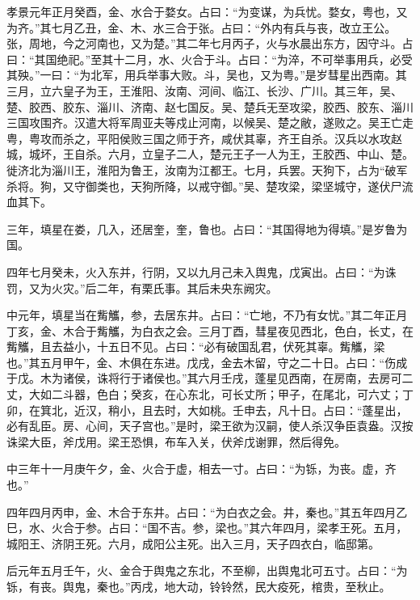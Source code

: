 \documentclass[12pt,UTF8]{ctexbook}
\begin{document}
孝景元年正月癸酉，金、水合于婺女。占曰：“为变谋，为兵忧。婺女，粤也，又为齐。”其七月乙丑，金、木、水三合于张。占曰：“外内有兵与丧，改立王公。张，周地，今之河南也，又为楚。”其二年七月丙子，火与水晨出东方，因守斗。占曰：“其国绝祀。”至其十二月，水、火合于斗。占曰：“为淬，不可举事用兵，必受其殃。”一曰：“为北军，用兵举事大败。斗，吴也，又为粤。”是岁彗星出西南。其三月，立六皇子为王，王淮阳、汝南、河间、临江、长沙、广川。其三年，吴、楚、胶西、胶东、淄川、济南、赵七国反。吴、楚兵无至攻梁，胶西、胶东、淄川三国攻围齐。汉遣大将军周亚夫等戍止河南，以候吴、楚之敝，遂败之。吴王亡走粤，粤攻而杀之，平阳侯败三国之师于齐，咸伏其辜，齐王自杀。汉兵以水攻赵城，城坏，王自杀。六月，立皇子二人，楚元王子一人为王，王胶西、中山、楚。徙济北为淄川王，淮阳为鲁王，汝南为江都王。七月，兵罢。天狗下，占为“破军杀将。狗，又守御类也，天狗所降，以戒守御。”吴、楚攻梁，梁坚城守，遂伏尸流血其下。



三年，填星在娄，几入，还居奎，奎，鲁也。占曰：“其国得地为得填。”是岁鲁为国。



四年七月癸未，火入东并，行阴，又以九月己未入舆鬼，戊寅出。占曰：“为诛罚，又为火灾。”后二年，有栗氏事。其后未央东阙灾。



中元年，填星当在觜觿，参，去居东井。占曰：“亡地，不乃有女忧。”其二年正月丁亥，金、木合于觜觿，为白衣之会。三月丁酉，彗星夜见西北，色白，长丈，在觜觿，且去益小，十五日不见。占曰：“必有破国乱君，伏死其辜。觜觿，梁也。”其五月甲午，金、木俱在东进。戊戌，金去木留，守之二十日。占曰：“伤成于戊。木为诸侯，诛将行于诸侯也。”其六月壬戌，蓬星见西南，在房南，去房可二丈，大如二斗器，色白；癸亥，在心东北，可长丈所；甲子，在尾北，可六丈；丁卯，在箕北，近汉，稍小，且去时，大如桃。壬申去，凡十日。占曰：“蓬星出，必有乱臣。房、心间，天子宫也。”是时，梁王欲为汉嗣，使人杀汉争臣袁盎。汉按诛梁大臣，斧戊用。梁王恐惧，布车入关，伏斧戊谢罪，然后得免。



中三年十一月庚午夕，金、火合于虚，相去一寸。占曰：“为铄，为丧。虚，齐也。”



四年四月丙申，金、木合于东井。占曰：“为白衣之会。井，秦也。”其五年四月乙巳，水、火合于参。占曰：“国不吉。参，梁也。”其六年四月，梁孝王死。五月，城阳王、济阴王死。六月，成阳公主死。出入三月，天子四衣白，临邸第。



后元年五月壬午，火、金合于舆鬼之东北，不至柳，出舆鬼北可五寸。占曰：“为铄，有丧。舆鬼，秦也。”丙戌，地大动，铃铃然，民大疫死，棺贵，至秋止。
\end{document}
